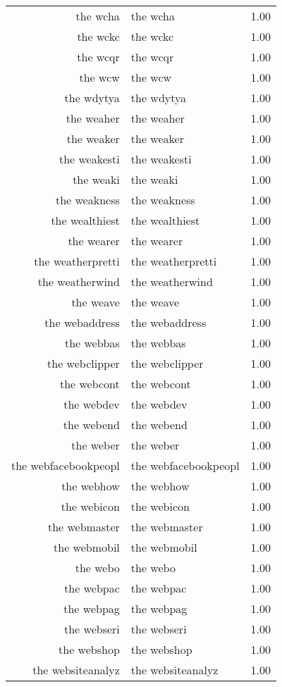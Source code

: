 \begin{table}[ht]
\begin{tabular}{rlr}
  the wcha & the wcha & 1.00 \\ 
  the wckc & the wckc & 1.00 \\ 
  the wcqr & the wcqr & 1.00 \\ 
  the wcw & the wcw & 1.00 \\ 
  the wdytya & the wdytya & 1.00 \\ 
  the weaher & the weaher & 1.00 \\ 
  the weaker & the weaker & 1.00 \\ 
  the weakesti & the weakesti & 1.00 \\ 
  the weaki & the weaki & 1.00 \\ 
  the weakness & the weakness & 1.00 \\ 
  the wealthiest & the wealthiest & 1.00 \\ 
  the wearer & the wearer & 1.00 \\ 
  the weatherpretti & the weatherpretti & 1.00 \\ 
  the weatherwind & the weatherwind & 1.00 \\ 
  the weave & the weave & 1.00 \\ 
  the webaddress & the webaddress & 1.00 \\ 
  the webbas & the webbas & 1.00 \\ 
  the webclipper & the webclipper & 1.00 \\ 
  the webcont & the webcont & 1.00 \\ 
  the webdev & the webdev & 1.00 \\ 
  the webend & the webend & 1.00 \\ 
  the weber & the weber & 1.00 \\ 
  the webfacebookpeopl & the webfacebookpeopl & 1.00 \\ 
  the webhow & the webhow & 1.00 \\ 
  the webicon & the webicon & 1.00 \\ 
  the webmaster & the webmaster & 1.00 \\ 
  the webmobil & the webmobil & 1.00 \\ 
  the webo & the webo & 1.00 \\ 
  the webpac & the webpac & 1.00 \\ 
  the webpag & the webpag & 1.00 \\ 
  the webseri & the webseri & 1.00 \\ 
  the webshop & the webshop & 1.00 \\ 
  the websiteanalyz & the websiteanalyz & 1.00 \\ 

\end{tabular}
\end{table}
